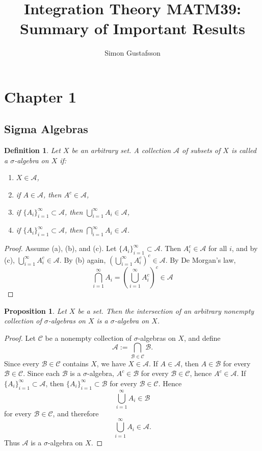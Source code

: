 \documentclass[12pt]{article}
\title{Integration Theory MATM39: Summary of Important Results}
\author{Simon Gustafsson}
\date{}
\newtheorem{definition}{Definition}
\newtheorem{proposition}{Proposition}
\begin{document}
\maketitle

\section*{Chapter 1}

\subsection*{Sigma Algebras}
\begin{definition}
Let $X$ be an arbitrary set. A collection $\mathcal{A}$ of subsets of $X$ is called a \emph{$\sigma$-algebra} on $X$ if:
\begin{enumerate}[label=(\alph*)]
    \item $X \in \mathcal{A}$,
    \item if $A \in \mathcal{A}$, then $A^c \in \mathcal{A}$,
    \item if $\{A_i\}_{i=1}^\infty \subset \mathcal{A}$, then $\bigcup_{i=1}^\infty A_i \in \mathcal{A}$,
    \item if $\{A_i\}_{i=1}^\infty \subset \mathcal{A}$, then $\bigcap_{i=1}^\infty A_i \in \mathcal{A}$.
\end{enumerate}
\end{definition}

\begin{proof}
Assume (a), (b), and (c). Let $\{A_i\}_{i=1}^\infty \subset \mathcal{A}$. Then $A_i^c \in \mathcal{A}$ for all $i$, and by (c),
\(\bigcup_{i=1}^\infty A_i^c \in \mathcal{A}\). By (b) again, \(\left( \bigcup_{i=1}^\infty A_i^c \right)^c \in \mathcal{A}.\)
By De Morgan’s law,
\[
\bigcap_{i=1}^\infty A_i = \left( \bigcup_{i=1}^\infty A_i^c \right)^c \in \mathcal{A}
\]

\end{proof}

\begin{proposition}
Let $X$ be a set. Then the intersection of an arbitrary nonempty collection of
$\sigma$-algebras on $X$ is a $\sigma$-algebra on $X$.
\end{proposition}

\begin{proof}
Let $\mathcal{C}$ be a nonempty collection of $\sigma$-algebras on $X$, and define
\[
\mathcal{A} := \bigcap_{\mathcal{B} \in \mathcal{C}} \mathcal{B}.
\]
Since every $\mathcal{B} \in \mathcal{C}$ contains $X$, we have $X \in \mathcal{A}$.
If $A \in \mathcal{A}$, then $A \in \mathcal{B}$ for every
$\mathcal{B} \in \mathcal{C}$. Since each $\mathcal{B}$ is a $\sigma$-algebra,
$A^c \in \mathcal{B}$ for every $\mathcal{B} \in \mathcal{C}$, hence
$A^c \in \mathcal{A}$. If $\{A_i\}_{i=1}^{\infty} \subset \mathcal{A}$, then
$\{A_i\}_{i=1}^{\infty} \subset \mathcal{B}$ for every
$\mathcal{B} \in \mathcal{C}$. Hence
\[
\bigcup_{i=1}^{\infty} A_i \in \mathcal{B}
\]
for every $\mathcal{B} \in \mathcal{C}$, and therefore
\[
\bigcup_{i=1}^{\infty} A_i \in \mathcal{A}.
\]
Thus $\mathcal{A}$ is a $\sigma$-algebra on $X$.
\end{proof}
\end{document}
